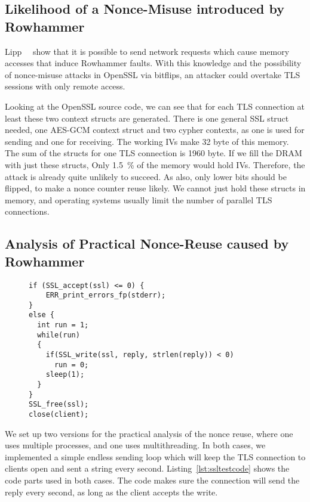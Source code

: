 \subsection{Likelihood of a Nonce-Misuse introduced by Rowhammer}

Lipp~\etal~\cite{nethammer} show that it is possible to send network requests
which cause memory accesses that induce Rowhammer faults. With this knowledge
and the possibility of nonce-misuse attacks in OpenSSL via bitflips, an attacker
could overtake TLS sessions with only remote access.

Looking at the OpenSSL source code, we can see that for each TLS connection at
least these two context structs are generated. There is one general SSL struct
needed, one AES-GCM context struct and two cypher contexts, as one is used for
sending and one for receiving. The working IVs make \num{32} byte of this
memory. The sum of the structs for one TLS connection is \num{1960} byte. If we
fill the DRAM with just these structs, Only \SI{1.5}{\percent} of the memory
would hold IVs. Therefore, the attack is already quite unlikely to succeed. As
also, only lower bits should be flipped, to make a nonce counter reuse
likely. We cannot just hold these structs in memory, and operating
systems usually limit the number of parallel TLS connections.

\subsection{Analysis of Practical Nonce-Reuse caused by Rowhammer}

\begin{figure}
\begin{minipage}{\linewidth}
\begin{lstlisting}[style=CStyle,
                   caption={Code showing an example for a simple TLS server,
keeping sending a reply until the client disconnects.},
                   label={lst:ssltestcode}]
if (SSL_accept(ssl) <= 0) {
    ERR_print_errors_fp(stderr);
}
else {
  int run = 1;
  while(run)
  {
    if(SSL_write(ssl, reply, strlen(reply)) < 0)
      run = 0;
    sleep(1);
  }
}
SSL_free(ssl);
close(client);
\end{lstlisting}
\end{minipage}
\end{figure}

We set up two versions for the practical analysis of the nonce reuse, where one
uses multiple processes, and one uses multithreading. In both cases, we
implemented a simple endless sending loop which will keep the TLS connection to
clients open and sent a string every second. Listing~\ref{lst:ssltestcode}
shows the code parts used in both cases. The code makes sure the connection will
send the reply every second, as long as the client accepts the write.

